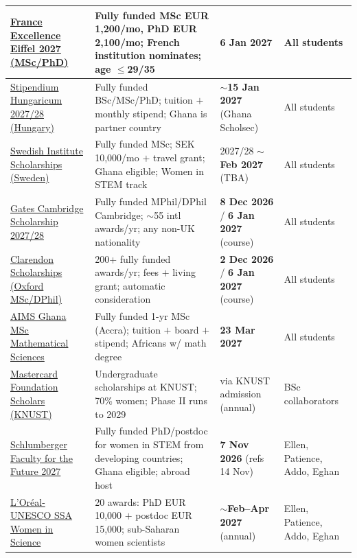 \documentclass[11pt,a4paper]{article}
\begin{document}
\begin{longtable}{@{}p{3.4cm}p{5.6cm}p{2.2cm}p{2.7cm}@{}}
\midrule
\href{https://www.campusfrance.org/en/france-excellence-eiffel-scholarship-program}{France Excellence Eiffel 2027 (MSc/PhD)} & Fully funded MSc EUR 1{,}200/mo, PhD EUR 2{,}100/mo; French institution nominates; age $\leq$29/35 & \textbf{6 Jan 2027} & All students \\
\midrule
\href{https://stipendiumhungaricum.hu/}{Stipendium Hungaricum 2027/28 (Hungary)} & Fully funded BSc/MSc/PhD; tuition $+$ monthly stipend; Ghana is partner country & $\sim$\textbf{15 Jan 2027} (Ghana Scholsec) & All students \\
\midrule
\href{https://si.se/en/apply/scholarships/swedish-institute-scholarships-for-global-professionals}{Swedish Institute Scholarships (Sweden)} & Fully funded MSc; SEK 10{,}000/mo $+$ travel grant; Ghana eligible; Women in STEM track & 2027/28 $\sim$\textbf{Feb 2027} (TBA) & All students \\
\midrule
\href{https://www.gatescambridge.org/apply/timeline/}{Gates Cambridge Scholarship 2027/28} & Fully funded MPhil/DPhil Cambridge; $\sim$55 intl awards/yr; any non-UK nationality & \textbf{8 Dec 2026} / \textbf{6 Jan 2027} (course) & All students \\
\midrule
\href{https://www.ox.ac.uk/admissions/graduate/fees-and-funding/funding/clarendon}{Clarendon Scholarships (Oxford MSc/DPhil)} & 200+ fully funded awards/yr; fees $+$ living grant; automatic consideration & \textbf{2 Dec 2026} / \textbf{6 Jan 2027} (course) & All students \\
\midrule
\href{https://aims.edu.gh/application/masters-in-mathematical-sciences-application}{AIMS Ghana MSc Mathematical Sciences} & Fully funded 1-yr MSc (Accra); tuition $+$ board $+$ stipend; Africans w/ math degree & \textbf{23 Mar 2027} & All students \\
\midrule
\href{https://mcf.knust.edu.gh/scholars-program}{Mastercard Foundation Scholars (KNUST)} & Undergraduate scholarships at KNUST; 70\% women; Phase II runs to 2029 & via KNUST admission (annual) & BSc collaborators \\
\midrule
\href{https://schlumbergerfoundation.com/apply-now/}{Schlumberger Faculty for the Future 2027} & Fully funded PhD/postdoc for women in STEM from developing countries; Ghana eligible; abroad host & \textbf{7 Nov 2026} (refs 14 Nov) & Ellen, Patience, Addo, Eghan \\
\midrule
\href{https://www.fondationloreal.com/our-programs-women-science-national-and-regional-young-talents-programs/sub-saharan-africa-young}{L'Oréal-UNESCO SSA Women in Science} & 20 awards: PhD EUR 10{,}000 $+$ postdoc EUR 15{,}000; sub-Saharan women scientists & $\sim$\textbf{Feb--Apr 2027} (annual) & Ellen, Patience, Addo, Eghan \\

\end{longtable}
\end{document}
